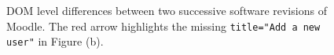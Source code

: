 \begin{figure}[ht!] 
\centering     %
{}
  \captionsetup{justification=justified,
singlelinecheck=false}
\caption{DOM level differences between two successive software revisions of Moodle. The red arrow highlights the missing \texttt{title="Add a new user"} in Figure (b). }
\label{fig:lasso3}
\end{figure} 

